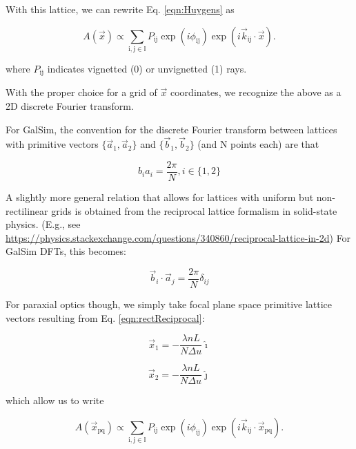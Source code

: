 \documentclass{article}
\begin{document}
With this lattice, we can rewrite Eq. \ref{eqn:Huygens} as

\begin{equation}
    A(\vec{x}) \propto \sum_{\mathrm{i},\mathrm{j} \in \mathbb{I}} P_{\mathrm{ij}}
        \exp\left(i \phi_{\mathrm{ij}}\right)
        \exp\left(i \vec{k}_{\mathrm{ij}}\cdot \vec{x}\right).
\end{equation}

where $P_{\mathrm{ij}}$ indicates vignetted (0) or unvignetted (1) rays.

With the proper choice for a grid of $\vec{x}$ coordinates, we recognize the above as a 2D discrete
Fourier transform.

For GalSim, the convention for the discrete Fourier transform between lattices with primitive vectors
$\{\vec{a}_1, \vec{a}_2\}$ and $\{\vec{b}_1, \vec{b}_2\}$ (and N points each) are that

\begin{equation}
    b_i a_i = \frac{2 \pi}{N}, i \in \{1, 2\}
    \label{eqn:rectReciprocal}
\end{equation}

A slightly more general relation that allows for lattices with uniform but non-rectilinear grids is
obtained from the reciprocal lattice formalism in solid-state physics.  (E.g., see
\url{https://physics.stackexchange.com/questions/340860/reciprocal-lattice-in-2d}) For GalSim DFTs,
this becomes:

\begin{equation}
    \vec{b}_i \cdot \vec{a}_j = \frac{2 \pi}{N} \delta_{ij}
    \label{eqn:reciprocal}
\end{equation}

For paraxial optics though, we simply take focal plane space primitive lattice vectors resulting
from Eq. \ref{eqn:rectReciprocal}:

\begin{equation}
    \vec{x}_1 = -\frac{\lambda n L}{N \Delta u} \hat{\imath}
\end{equation}

\begin{equation}
    \vec{x}_2 = -\frac{\lambda n L}{N \Delta u} \hat{\jmath}
\end{equation}

which allow us to write

\begin{equation}
    A(\vec{x}_{\mathrm{pq}}) \propto \sum_{\mathrm{i},\mathrm{j} \in \mathbb{I}}
        P_{\mathrm{ij}}
        \exp\left(i \phi_{\mathrm{ij}}\right)
        \exp\left(i \vec{k}_{\mathrm{ij}}\cdot \vec{x}_{\mathrm{pq}}\right).
\end{equation}
\end{document}
